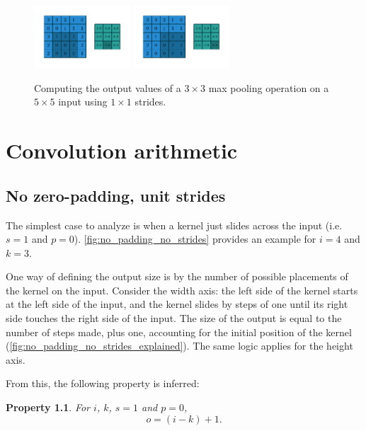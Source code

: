 \documentclass{report}
\newtheorem{prop}{Property}
\begin{document}
\begin{figure}[p]
    \includegraphics[width=0.32\textwidth]{pdf/numerical_max_pooling_07.pdf}
    \includegraphics[width=0.32\textwidth]{pdf/numerical_max_pooling_08.pdf}
    \caption{\label{fig:numerical_max_pooling} Computing the output values of a
        $3 \times 3$ max pooling operation on a $5 \times 5$ input using $1
        \times 1$ strides.}
\end{figure}

\chapter{Convolution arithmetic}

\section{No zero-padding, unit strides}

The simplest case to analyze is when a kernel just slides across the input (i.e.
$s = 1$ and $p = 0$). \autoref{fig:no_padding_no_strides} provides an example
for $i = 4$ and $k = 3$.

One way of defining the output size is by the number of possible placements of
the kernel on the input. Consider the width axis: the left side of the kernel
starts at the left side of the input, and the kernel slides by steps of one
until its right side touches the right side of the input. The size of the output
is equal to the number of steps made, plus one, accounting for the initial
position of the kernel (\autoref{fig:no_padding_no_strides_explained}). The same
logic applies for the height axis.

From this, the following property is inferred:

\begin{prop}\label{prop:no_padding_no_strides}
For $i$, $k$, $s = 1$ and $p = 0$,
\begin{equation*}
    o = (i - k) + 1.
\end{equation*}
\end{prop}
\end{document}
